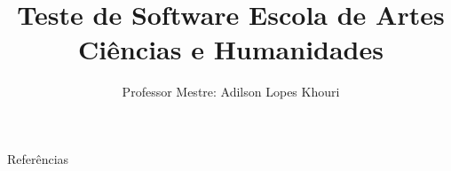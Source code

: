 \documentclass[compress, hyperref={pdfpagelayout=SinglePage}]{beamer}
\title[SIN5022]{Teste de Software Escola de Artes Ciências e Humanidades}
\author{Professor Mestre: Adilson Lopes Khouri}
\begin{document}
	\begin{frame}
		\titlepage
	\end{frame}
	
	
	
	
	
	

	
		
	
	
	

	

	

	\begin{frame}{}
		\begin{block}{Referências}
			\tiny
			\nocite{*}
			
	    		
		\end{block}
	\end{frame}
\end{document}
